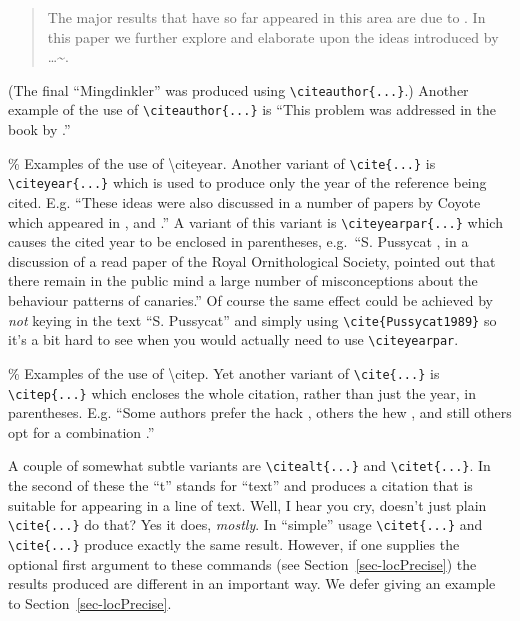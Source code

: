\documentclass[
  times,
  doublespace]{anzsauth}
\begin{document}
\begin{quote}
The major results that have so far appeared in this area are due to
\cite{Mingdinkler1999}. In this paper we further explore and elaborate
upon the ideas introduced by \citeauthor{Mingdinkler1999}
\ldots\textasciitilde.
\end{quote}

(The final ``Mingdinkler'' was produced using
\texttt{\textbackslash{}citeauthor\{...\}}.) Another example of the use
of \texttt{\textbackslash{}citeauthor\{...\}} is ``This problem was
addressed in the book by \citeauthor{Thecowsoutside1984}.''

\% Examples of the use of \textbackslash citeyear. Another variant of
\texttt{\textbackslash{}cite\{...\}} is
\texttt{\textbackslash{}citeyear\{...\}} which is used to produce only
the year of the reference being cited. E.g. ``These ideas were also
discussed in a number of papers by Coyote which appeared in
\citeyear{Coyote2001}, \citeyear{Coyote2007} and
\citeyear{Coyote2010}.'' A variant of this variant is
\texttt{\textbackslash{}citeyearpar\{...\}} which causes the cited year
to be enclosed in parentheses, e.g.~``S. Pussycat
\citeyearpar{Pussycat1989}, in a discussion of a read paper of the Royal
Ornithological Society, pointed out that there remain in the public mind
a large number of misconceptions about the behaviour patterns of
canaries.'' Of course the same effect could be achieved by \emph{not}
keying in the text ``S. Pussycat'' and simply using
\texttt{\textbackslash{}cite\{Pussycat1989\}} so it's a bit hard to see
when you would actually need to use
\texttt{\textbackslash{}citeyearpar}.

\% Examples of the use of \textbackslash citep. Yet another variant of
\texttt{\textbackslash{}cite\{...\}} is
\texttt{\textbackslash{}citep\{...\}} which encloses the whole citation,
rather than just the year, in parentheses. E.g. ``Some authors prefer
the hack \citep{Cook1966}, others the hew \citep{Moore1967}, and still
others opt for a combination \citep{CookMoore1968}.''

A couple of somewhat subtle variants are
\texttt{\textbackslash{}citealt\{...\}} and
\texttt{\textbackslash{}citet\{...\}}. In the second of these the ``t''
stands for ``text'' and produces a citation that is suitable for
appearing in a line of text. Well, I hear you cry, doesn't just plain
\texttt{\textbackslash{}cite\{...\}} do that? Yes it does,
\emph{mostly}. In ``simple'' usage \texttt{\textbackslash{}citet\{...\}}
and \texttt{\textbackslash{}cite\{...\}} produce exactly the same
result. However, if one supplies the optional first argument to these
commands (see Section~\ref{sec-locPrecise}) the results produced are
different in an important way. We defer giving an example to
Section~\ref{sec-locPrecise}.
\end{document}
